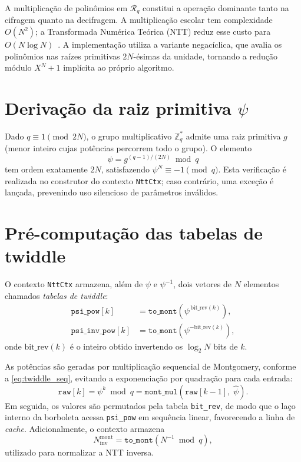 \documentclass[11pt,a4paper]{report}
\newcommand{\Rq}{\mathcal{R}_q}
\begin{document}
A multiplicação de polinômios em $\Rq$ constitui a operação dominante tanto na cifragem
quanto na decifragem. A multiplicação escolar tem complexidade $O(N^2)$; a Transformada
Numérica Teórica (NTT) reduz esse custo para $O(N \log N)$~\cite{LongaNaehrig2016}.
A implementação utiliza a variante negacíclica, que avalia os polinômios nas raízes
primitivas $2N$-ésimas da unidade, tornando a redução módulo $X^N+1$ implícita ao
próprio algoritmo.

\section{Derivação da raiz primitiva $\psi$}
\label{sec:psi}

Dado $q \equiv 1 \pmod{2N}$, o grupo multiplicativo $\mathbb{Z}_q^*$ admite uma raiz
primitiva $g$ (menor inteiro cujas potências percorrem todo o grupo). O elemento
\begin{equation}
  \psi = g^{(q-1)/(2N)} \bmod q
  \label{eq:psi}
\end{equation}
tem ordem exatamente $2N$, satisfazendo $\psi^N \equiv -1 \pmod{q}$. Esta verificação
é realizada no construtor do contexto \texttt{NttCtx}; caso contrário, uma exceção é
lançada, prevenindo uso silencioso de parâmetros inválidos.

\section{Pré-computação das tabelas de twiddle}
\label{sec:twiddle}

O contexto \texttt{NttCtx} armazena, além de $\psi$ e $\psi^{-1}$, dois vetores de
$N$ elementos chamados \emph{tabelas de twiddle}:
\begin{align}
  \texttt{psi\_pow}[k] &= \texttt{to\_mont}(\psi^{\,\text{bit\_rev}(k)}),
    \label{eq:psi_pow}\\
  \texttt{psi\_inv\_pow}[k] &= \texttt{to\_mont}(\psi^{-\text{bit\_rev}(k)}),
    \label{eq:psi_inv_pow}
\end{align}
onde $\text{bit\_rev}(k)$ é o inteiro obtido invertendo os $\log_2 N$ bits de $k$.

As potências são geradas por multiplicação sequencial de Montgomery, conforme a
\cref{eq:twiddle_seq}, evitando a exponenciação por quadração para cada entrada:
\begin{equation}
  \texttt{raw}[k] = \psi^k \bmod q
    = \texttt{mont\_mul}(\texttt{raw}[k-1],\; \hat{\psi}).
  \label{eq:twiddle_seq}
\end{equation}
Em seguida, os valores são permutados pela tabela \texttt{bit\_rev}, de modo que o
laço interno da borboleta acessa \texttt{psi\_pow} em sequência linear, favorecendo
a linha de \emph{cache}. Adicionalmente, o contexto armazena
\begin{equation}
  N_{\text{inv}}^{\text{mont}} = \texttt{to\_mont}(N^{-1} \bmod q),
  \label{eq:ninv}
\end{equation}
utilizado para normalizar a NTT inversa.
\end{document}

